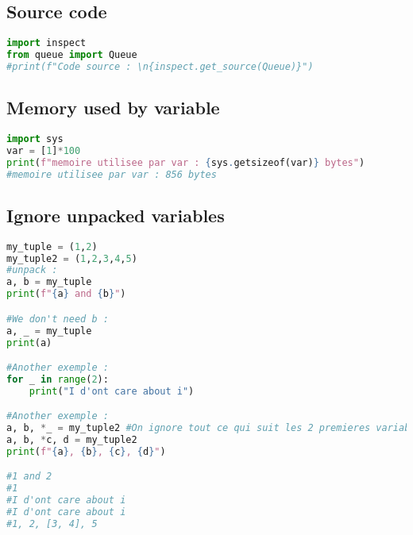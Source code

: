 \documentclass[a4paper, 12pt]{article}
\begin{document}
\subsection{Source code}
\begin{lstlisting}[language=Python]
import inspect
from queue import Queue
#print(f"Code source : \n{inspect.get_source(Queue)}")
\end{lstlisting}

\subsection{Memory used by variable}
\begin{lstlisting}[language=Python]
import sys
var = [1]*100
print(f"memoire utilisee par var : {sys.getsizeof(var)} bytes")
#memoire utilisee par var : 856 bytes
\end{lstlisting}

\subsection{Ignore unpacked variables}
\begin{lstlisting}[language=Python]
my_tuple = (1,2)
my_tuple2 = (1,2,3,4,5)
#unpack :
a, b = my_tuple
print(f"{a} and {b}")

#We don't need b :
a, _ = my_tuple
print(a)

#Another exemple :
for _ in range(2):
	print("I d'ont care about i")

#Another exemple :
a, b, *_ = my_tuple2 #On ignore tout ce qui suit les 2 premieres variables, le reste est stocke dans une liste
a, b, *c, d = my_tuple2 
print(f"{a}, {b}, {c}, {d}")

#1 and 2
#1
#I d'ont care about i
#I d'ont care about i
#1, 2, [3, 4], 5
\end{lstlisting}
\end{document}
